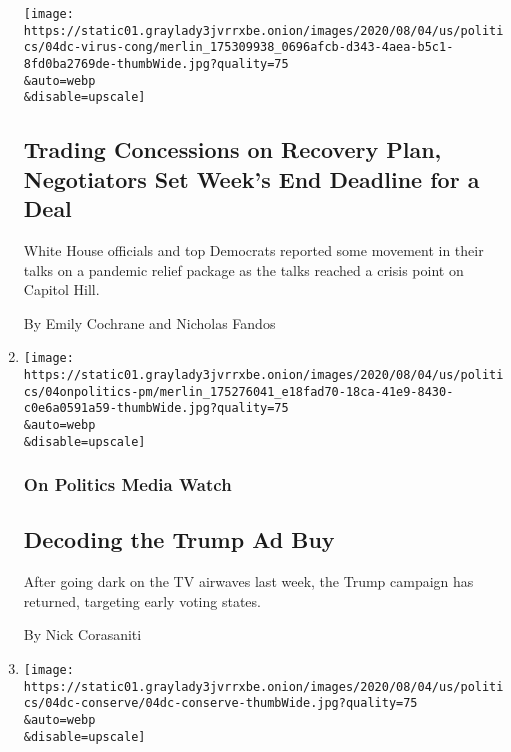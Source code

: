 \begin{enumerate}
  \texttt{[image: https://static01.graylady3jvrrxbe.onion/images/2020/08/04/us/politics/04dc-virus-cong/merlin\_175309938\_0696afcb-d343-4aea-b5c1-8fd0ba2769de-thumbWide.jpg?quality=75\\\&auto=webp\\\&disable=upscale]}

  \hypertarget{trading-concessions-on-recovery-plan-negotiators-set-weeks-end-deadline-for-a-deal}{%
  \subsection{Trading Concessions on Recovery Plan, Negotiators Set
  Week's End Deadline for a
  Deal}\label{trading-concessions-on-recovery-plan-negotiators-set-weeks-end-deadline-for-a-deal}}

  White House officials and top Democrats reported some movement in
  their talks on a pandemic relief package as the talks reached a crisis
  point on Capitol Hill.

  By Emily Cochrane and Nicholas Fandos
\item
  \href{/2020/08/04/us/politics/decoding-the-trump-ad-buy.html}{}

  \texttt{[image: https://static01.graylady3jvrrxbe.onion/images/2020/08/04/us/politics/04onpolitics-pm/merlin\_175276041\_e18fad70-18ca-41e9-8430-c0e6a0591a59-thumbWide.jpg?quality=75\\\&auto=webp\\\&disable=upscale]}

  \hypertarget{on-politics-media-watch}{%
  \subsubsection{On Politics Media
  Watch}\label{on-politics-media-watch}}

  \hypertarget{decoding-the-trump-ad-buy}{%
  \subsection{Decoding the Trump Ad
  Buy}\label{decoding-the-trump-ad-buy}}

  After going dark on the TV airwaves last week, the Trump campaign has
  returned, targeting early voting states.

  By Nick Corasaniti
\item
  \href{/2020/08/04/us/politics/trump-land-conservation-bill.html}{}

  \texttt{[image: https://static01.graylady3jvrrxbe.onion/images/2020/08/04/us/politics/04dc-conserve/04dc-conserve-thumbWide.jpg?quality=75\\\&auto=webp\\\&disable=upscale]}

  \hypertarget{trump-signs-landmark-land-conservation-bill}{%
}
\end{enumerate}
